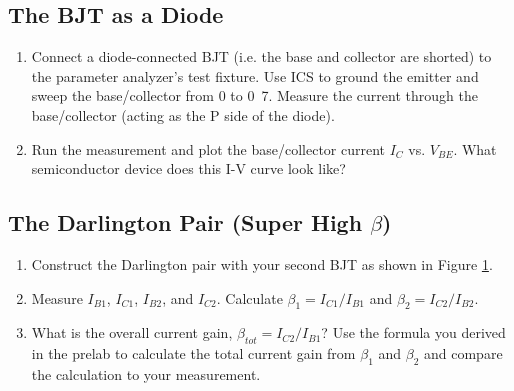 \documentclass{article}
\begin{document}
\subsection{The BJT as a Diode}

\begin{enumerate}
\item Connect a diode-connected BJT (i.e. the base and collector are shorted) to the parameter analyzer's test fixture. Use ICS to ground the emitter and sweep the base/collector from \unit{0}{\volt} to \unit{0.7}{\volt}. Measure the current through the base/collector (acting as the P side of the diode).

\item Run the measurement and plot the base/collector current $I_{C}$ vs. $V_{BE}$. What semiconductor device does this I-V curve look like?

\end{enumerate}

\subsection{The Darlington Pair (Super High $\beta$)}

\begin{enumerate}

	\begin{figure}[!htb]
		
		\centerline{\box\graph}
		\caption{Darlington configuration for measurement}
		\label{darlington}
	\end{figure}

\item Construct the Darlington pair with your second BJT as shown in Figure \ref{darlington}.

\item Measure $I_{B1}$, $I_{C1}$, $I_{B2}$, and $I_{C2}$. Calculate $\beta_1 = I_{C1}/I_{B1}$ and $\beta_2 = I_{C2}/I_{B2}$.

\item What is the overall current gain, $\beta_{tot} = I_{C2}/I_{B1}$? Use the formula you derived in the prelab to calculate the total current gain from $\beta_1$ and $\beta_2$ and compare the calculation to your measurement.

\end{enumerate}
\end{document}
